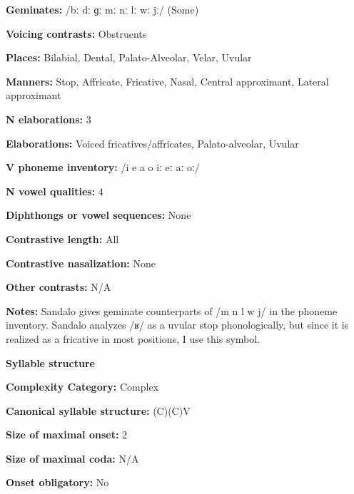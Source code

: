 \textbf{Geminates:} /bː dː ɡː mː nː lː wː jː/ (Some)



\textbf{Voicing contrasts:} Obstruents



\textbf{Places:} Bilabial, Dental, Palato-Alveolar, Velar, Uvular



\textbf{Manners:} Stop, Affricate, Fricative, Nasal, Central approximant, Lateral approximant



\textbf{N elaborations:} 3



\textbf{Elaborations:} Voiced fricatives/affricates, Palato-alveolar, Uvular



\textbf{V phoneme inventory:} /i e a o iː eː aː oː/



\textbf{N vowel qualities:} 4



\textbf{Diphthongs or vowel sequences:} None



\textbf{Contrastive length:} All



\textbf{Contrastive nasalization:} None



\textbf{Other contrasts:} N/A



\textbf{Notes:} Sandalo gives geminate counterparts of /m n l w j/ in the phoneme inventory. Sandalo analyzes /ʁ/ as a uvular stop phonologically, but since it is realized as a fricative in most positions, I use this symbol.



\textbf{Syllable structure}



\textbf{Complexity Category:} Complex



\textbf{Canonical syllable structure:} (C)(C)V \citep[17-18]{Sandalo1997}



\textbf{Size of maximal onset:} 2



\textbf{Size of maximal coda:} N/A



\textbf{Onset obligatory:} No



